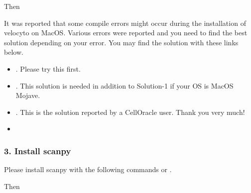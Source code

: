 \documentclass[letterpaper,10pt,english]{sphinxmanual}
\begin{document}
Then

\begin{sphinxVerbatim}[commandchars=\\\{\}]
  
\end{sphinxVerbatim}

It was reported that some compile errors might occur during the installation of velocyto on MacOS.
Various errors were reported and you need to find the best solution depending on your error.
You may find the solution with these links below.
\begin{itemize}
\item {} 
. Please try this first.

\item {} 
. This solution is needed in addition to Solution-1 if your OS is MacOS Mojave.

\item {} 
. This is the solution reported by a CellOracle user. Thank you very much!

\item {} 

\end{itemize}


\subsubsection{3. Install scanpy}
\label{\detokenize{installation/index:install-scanpy}}
Please install scanpy with the following commands or  .

\begin{sphinxVerbatim}[commandchars=\\\{\}]
       
\end{sphinxVerbatim}

Then

\begin{sphinxVerbatim}[commandchars=\\\{\}]
  
\end{sphinxVerbatim}
\end{document}
